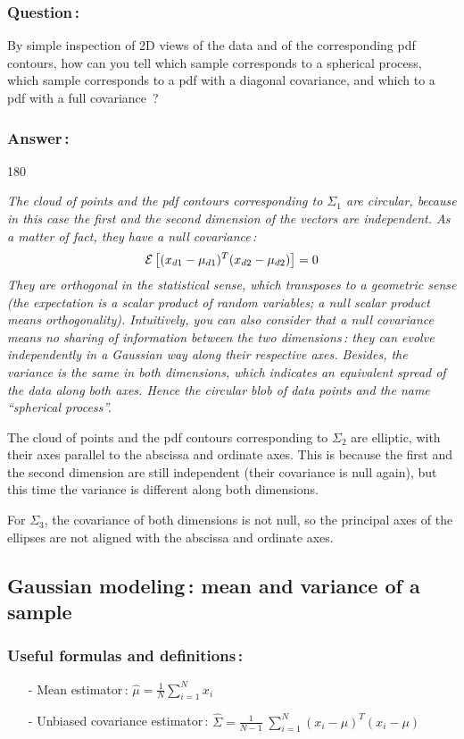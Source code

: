 \documentclass[twoside,a4paper,titlepage]{article}
\newcommand{\expl}[1]{%
\begin{turn}{180}%
\parbox{\textwidth}{\em #1}%
\end{turn}%
}
\newcommand{\tab}{\hspace{1em}}
\begin{document}
\subsubsection*{Question\,:}
By simple inspection of 2D views of the data and of the corresponding pdf
contours, how can you tell which sample corresponds to a spherical process,
which sample corresponds to a pdf with a diagonal covariance, and which to
a pdf with a full covariance~?

\subsubsection*{Answer\,:}
\expl{The cloud of points and the pdf contours corresponding to $\Sigma_1$
are circular, because in this case the first and the second dimension of
the vectors are independent. As a matter of fact, they have a null
covariance\,:
\[ {\cal E}\left[(x_{d1}-\mu_{d1})^T (x_{d2}-\mu_{d2})\right] = 0 \]
They are {\em orthogonal} in the statistical sense, which transposes to a
geometric sense (the expectation is a scalar product of random variables; a
null scalar product means orthogonality). Intuitively, you can also
consider that a null covariance means no sharing of information between the
two dimensions\,: they can evolve independently in a Gaussian way along
their respective axes. Besides, the variance is the same in both
dimensions, which indicates an equivalent spread of the data along both
axes. Hence the circular blob of data points and the name ``spherical
process''.

\medskip

\tab The cloud of points and the pdf contours corresponding to $\Sigma_2$
are elliptic, with their axes parallel to the abscissa and ordinate
axes. This is because the first and the second dimension are still
independent (their covariance is null again), but this time the variance is
different along both dimensions.

\medskip

\tab For $\Sigma_3$, the covariance of both dimensions is not null, so the
principal axes of the ellipses are not aligned with the abscissa and
ordinate axes.}

\pagebreak
\subsection{Gaussian modeling\,: mean and variance of a sample}

\subsubsection*{Useful formulas and definitions\,:}
\begin{itemize}
\item[-] Mean estimator\,: $\hat{\mu} = \frac{1}{N} \sum_{i=1}^{N} x_i$
\item[-] Unbiased covariance estimator\,: $ \hat{\Sigma} = \frac{1}{N-1} \;
\sum_{i=1}^{N} (x_i-\mu)^T (x_i-\mu) $
\end{itemize}
\end{document}

